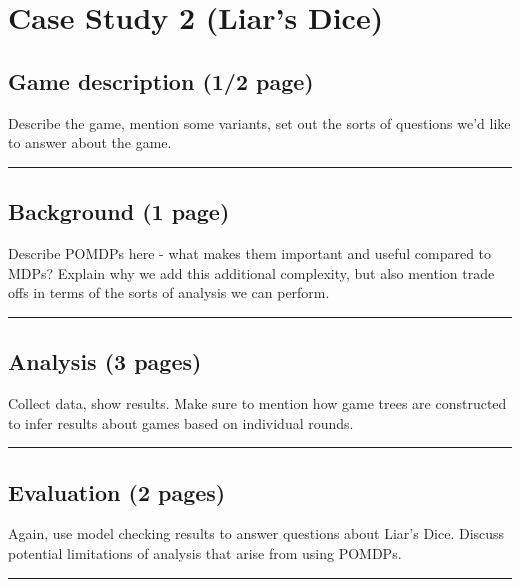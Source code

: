 \chapter{Case Study 2 (Liar's Dice)}

\section{Game description (1/2 page)}
Describe the game, mention some variants, set out the sorts of questions we'd like to answer about the game.

\hrule

\blindtext

\blindtext

\blindtext

\section{Background (1 page)}

Describe POMDPs here - what makes them important and useful compared to MDPs? Explain why we add this additional complexity, but also mention trade offs in terms of the sorts of analysis we can perform.

\hrule

\Blindtext

\section{Analysis (3 pages)}

Collect data, show results. Make sure to mention how game trees are constructed to infer results about games based on individual rounds.

\hrule

\Blindtext

\Blindtext

\Blindtext

\section{Evaluation (2 pages)}

Again, use model checking results to answer questions about Liar's Dice. Discuss potential limitations of analysis that arise from using POMDPs.

\hrule

\Blindtext

\Blindtext